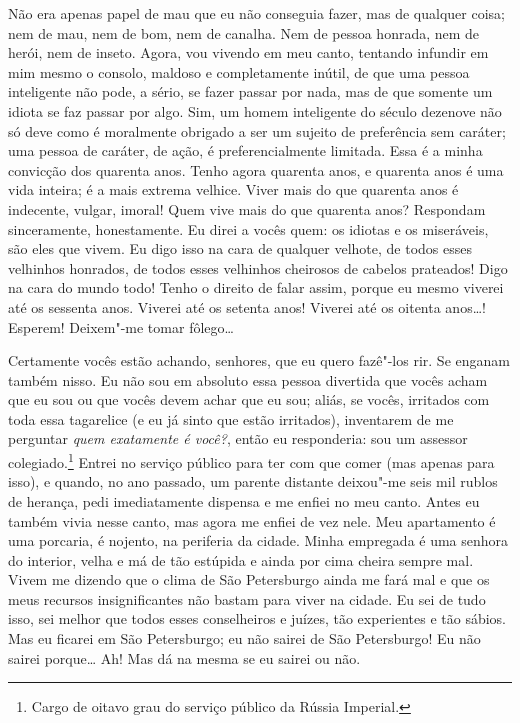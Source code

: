 Não era apenas papel de mau que eu não conseguia fazer, mas de qualquer
coisa; nem de mau, nem de bom, nem de canalha. Nem de pessoa honrada,
nem de herói, nem de inseto. Agora, vou vivendo em meu canto, tentando
infundir em mim mesmo o consolo, maldoso e completamente inútil, de que
uma pessoa inteligente não pode, a sério, se fazer passar por nada, mas
de que somente um idiota se faz passar por algo. Sim, um homem
inteligente do século dezenove não só deve como é moralmente obrigado a ser
um sujeito de preferência sem caráter; uma pessoa de caráter, de ação,
é preferencialmente limitada. Essa é a minha convicção dos quarenta
anos. Tenho agora quarenta anos, e quarenta anos é uma vida inteira; é
a mais extrema velhice. Viver mais do que quarenta anos é indecente,
vulgar, imoral! Quem vive mais do que quarenta anos? Respondam
sinceramente, honestamente. Eu direi a vocês quem: os idiotas e os
miseráveis, são eles que vivem. Eu digo isso na cara de qualquer
velhote, de todos esses velhinhos honrados, de todos esses velhinhos
cheirosos de cabelos prateados! Digo na cara do mundo todo! Tenho o
direito de falar assim, porque eu mesmo viverei até os sessenta anos.
Viverei até os setenta anos! Viverei até os oitenta anos\ldots{}! Esperem!
Deixem"-me tomar fôlego\ldots{}

Certamente vocês estão achando, senhores, que eu quero fazê"-los rir. Se
enganam também nisso. Eu não sou em absoluto essa pessoa divertida que
vocês acham que eu sou ou que vocês devem achar que eu sou; aliás, se
vocês, irritados com toda essa tagarelice (e eu já sinto que estão
irritados), inventarem de me perguntar \textit{quem exatamente é você?}, então
eu responderia: sou um assessor colegiado.\footnote{ Cargo de oitavo
grau do serviço público da Rússia Imperial.} Entrei no serviço público
para ter com que comer (mas apenas para isso), e quando, no ano
passado, um parente distante deixou"-me seis mil rublos de herança, pedi
imediatamente dispensa e me enfiei no meu canto. Antes eu também vivia
nesse canto, mas agora me enfiei de vez nele. Meu apartamento é uma
porcaria, é nojento, na periferia da cidade. Minha empregada é uma
senhora do interior, velha e má de tão estúpida e ainda por cima cheira
sempre mal. Vivem me dizendo que o clima de São Petersburgo ainda me
fará mal e que os meus recursos insignificantes não bastam para viver
na cidade. Eu sei de tudo isso, sei melhor que todos esses conselheiros
e juízes, tão experientes e tão sábios. Mas eu ficarei em São
Petersburgo; eu não sairei de São Petersburgo! Eu não sairei porque\ldots{}
Ah! Mas dá na mesma se eu sairei ou não.

